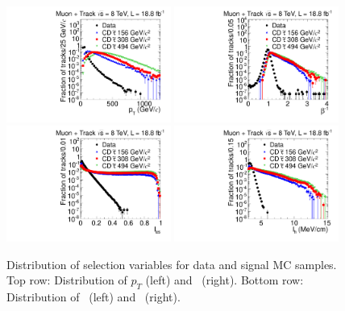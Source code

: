 \begin{figure}
\centering
  \includegraphics[clip=false, trim=0.0cm 0cm 0.0cm 0cm, width=0.48\textwidth]{figures/tkmu/Selection_Comp_8TeV_GMStau_Pt_BS}
  \includegraphics[clip=false, trim=0.0cm 0cm 0.0cm 0cm, width=0.48\textwidth]{figures/tkmu/Selection_Comp_8TeV_GMStau_TOF_BS} \\
  \includegraphics[clip=false, trim=0.0cm 0cm 0.0cm 0cm, width=0.48\textwidth]{figures/tkmu/Selection_Comp_8TeV_GMStau_Is_BS}
  \includegraphics[clip=false, trim=0.0cm 0cm 0.0cm 0cm, width=0.48\textwidth]{figures/tkmu/Selection_Comp_8TeV_GMStau_Im_BS}
  \caption[Distribution of selection variables in the \tktof\ analysis for data and signal MC samples.]
{Distribution of selection variables for data and signal MC samples.
Top row: Distribution of $p_T$ (left) and \invbeta\ (right).
Bottom row: Distribution of \ias\ (left) and \ih\ (right).}
    \label{fig:TkMuSelVar}
\end{figure}

